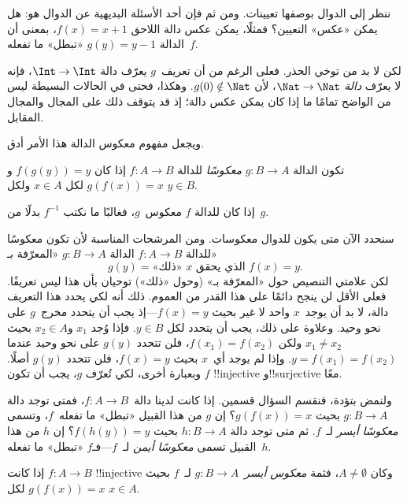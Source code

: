 \documentclass[../../../include/open-logic-section]{subfiles}
\begin{document}

\begin{explain}
ننظر إلى الدوال بوصفها تعيينات. ومن ثم فإن أحد الأسئلة البديهية عن
الدوال هو: هل يمكن «عكس» التعيين؟ فمثلًا، يمكن عكس دالة اللاحق
$f(x) = x + 1$، بمعنى أن الدالة $g(y) = y - 1$ «تبطل» ما تفعله~$f$.

لكن لا بد من توخي الحذر. فعلى الرغم من أن تعريف~$g$ يعرّف
دالة $\Int \to \Int$، فإنه لا يعرّف \emph{دالة} $\Nat
\to \Nat$، لأن $g(0) \notin \Nat$. وهكذا، فحتى في الحالات البسيطة
ليس من الواضح تمامًا ما إذا كان يمكن عكس دالة؛ إذ قد يتوقف ذلك على
المجال والمجال المقابل.

ويجعل مفهوم معكوس الدالة هذا الأمر أدق.
\end{explain}

\begin{defn}
تكون الدالة $g \colon B \to A$ \emph{معكوسًا} للدالة $f
\colon A \to B$ إذا كان $f(g(y)) = y$ و$g(f(x)) = x$ لكل $x \in A$
ولكل $y \in B$.
\end{defn}

إذا كان للدالة $f$ معكوس~$g$، فغالبًا ما نكتب $f^{-1}$ بدلًا من~$g$.

\begin{explain}
سنحدد الآن متى يكون للدوال معكوسات. ومن المرشحات المناسبة لأن تكون
معكوسًا للدالة $f\colon A \to B$ الدالة $g\colon B \to A$ «المعرّفة
بـ»
\[
g(y) = \text{«ذلك» $x$ الذي يحقق $f(x) = y$.}
\]
لكن علامتي التنصيص حول «المعرّفة بـ» (وحول «ذلك») توحيان بأن
هذا ليس تعريفًا. فعلى الأقل لن ينجح دائمًا على هذا القدر من العموم.
ذلك أنه لكي يحدد هذا التعريف دالة، لا بد أن يوجد~$x$ واحد لا غير
بحيث $f(x) =
y$---إذ يجب أن يتحدد مخرج~$g$ على نحو وحيد. وعلاوة على ذلك، يجب
أن يتحدد لكل $y \in B$. فإذا وُجد $x_1$ و$x_2 \in
A$ بحيث $x_1 \neq x_2$ ولكن $f(x_1) = f(x_2)$، فلن تتحدد $g(y)$
على نحو وحيد عندما $y = f(x_1) = f(x_2)$. وإذا لم يوجد أي~$x$
بحيث $f(x) = y$، فلن تتحدد $g(y)$ أصلًا. وبعبارة أخرى، لكي
تُعرّف $g$، يجب أن تكون $f$ !!{injective} و!!{surjective} معًا.

ولنمض بتؤدة، فنقسم السؤال قسمين. إذا كانت لدينا
دالة~$f\colon A \to B$، فمتى توجد دالة $g\colon B \to A$
بحيث $g(f(x)) = x$؟ إن $g$ من هذا القبيل «تبطل» ما تفعله~$f$، وتسمى
\emph{معكوسًا أيسر} لـ~$f$. ثم متى توجد
دالة $h\colon B \to A$ بحيث $f(h(y)) = y$؟ إن $h$ من هذا القبيل
تسمى \emph{معكوسًا أيمن} لـ~$f$---فـ$f$ «تبطل» ما تفعله~$h$.
\end{explain}

\begin{prop}
إذا كانت $f\colon A \to B$ !!{injective} وكان $A \neq \emptyset$، فثمة \emph{معكوس
أيسر}~$g\colon B \to A$ لـ~$f$ بحيث $g(f(x)) = x$ لكل $x
\in A$.
\end{prop}
\end{document}
